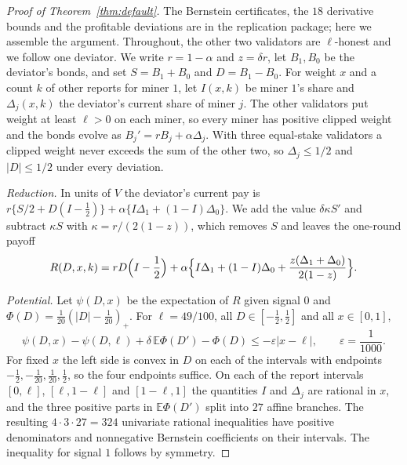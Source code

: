 \documentclass[sigconf,anonymous,review]{acmart}
\numberwithin{equation}{section}
\newcommand{\E}{\mathbb{E}}
\begin{document}
\begin{proof}[Proof of Theorem~\ref{thm:default}]
The Bernstein certificates, the $18$ derivative bounds and the profitable
deviations are in the replication package; here we assemble the argument.
Throughout, the other two validators are $\ell$-honest and we follow one
deviator. We write $r=1-\alpha$ and $z=\delta r$, let $B_1,B_0$ be the deviator's
bonds, and set $S=B_1+B_0$ and $D=B_1-B_0$. For weight $x$ and a count $k$ of
other reports for miner $1$, let $I(x,k)$ be miner $1$'s share and
$\Delta_j(x,k)$ the deviator's current share of miner $j$. The other validators
put weight at least $\ell>0$ on each miner, so every miner has positive clipped
weight and the bonds evolve as $B_j'=rB_j+\alpha\Delta_j$. With three
equal-stake validators a clipped weight never exceeds the sum of the other two,
so $\Delta_j\le1/2$ and $|D|\le1/2$ under every deviation.

\emph{Reduction.} In units of $V$ the deviator's current pay is
$r\{S/2+D(I-\frac12)\}+\alpha\{I\Delta_1+(1-I)\Delta_0\}$. We add the value
$\delta\kappa S'$ and subtract $\kappa S$ with $\kappa=r/(2(1-z))$, which removes
$S$ and leaves the one-round payoff
\begin{equation}\label{eq:reduced}
R(D,x,k)=rD\Bigl(I-\frac12\Bigr)+\alpha\Bigl\{I\Delta_1+(1-I)\Delta_0+\frac{z(\Delta_1+\Delta_0)}{2(1-z)}\Bigr\}.
\end{equation}

\emph{Potential.} Let $\psi(D,x)$ be the expectation of $R$ given signal $0$
and $\Phi(D)=\frac1{20}(|D|-\frac1{20})_+$. For $\ell=49/100$, all
$D\in[-\frac12,\frac12]$ and all $x\in[0,1]$,
\begin{equation}\label{eq:potential}
\psi(D,x)-\psi(D,\ell)+\delta\,\E\Phi(D')-\Phi(D)\le-\varepsilon|x-\ell|,\qquad \varepsilon=\frac1{1000}.
\end{equation}
For fixed $x$ the left side is convex in $D$ on each of the intervals with
endpoints $-\frac12,-\frac1{20},\frac1{20},\frac12$, so the four endpoints
suffice. On each of the report intervals $[0,\ell]$, $[\ell,1-\ell]$ and
$[1-\ell,1]$ the quantities $I$ and $\Delta_j$ are rational in $x$, and the
three positive parts in $\E\Phi(D')$ split into $27$ affine branches. The
resulting $4\cdot3\cdot27=324$ univariate rational inequalities have positive
denominators and nonnegative Bernstein coefficients on their intervals. The
inequality for signal $1$ follows by symmetry.


\end{proof}
\end{document}
